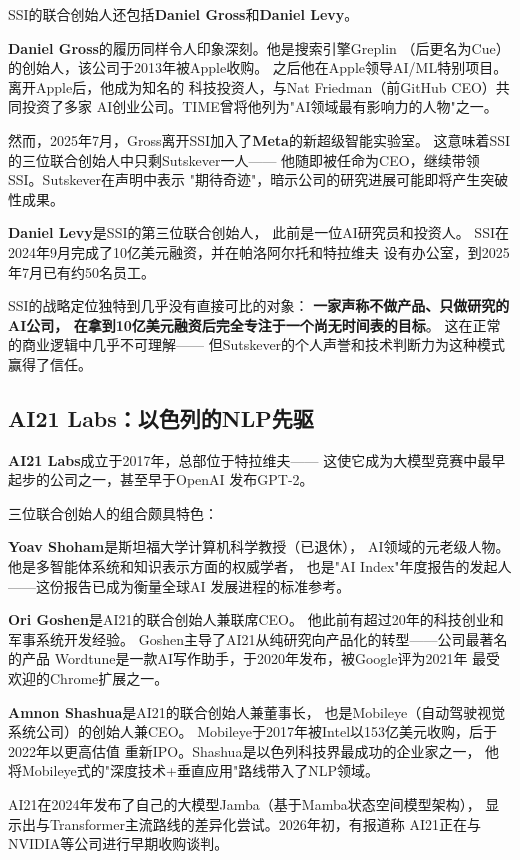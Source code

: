 SSI的联合创始人还包括\textbf{Daniel Gross}和\textbf{Daniel Levy}。

\textbf{Daniel Gross}的履历同样令人印象深刻。他是搜索引擎Greplin
（后更名为Cue）的创始人，该公司于2013年被Apple收购。
之后他在Apple领导AI/ML特别项目。离开Apple后，他成为知名的
科技投资人，与Nat Friedman（前GitHub CEO）共同投资了多家
AI创业公司。TIME曾将他列为"AI领域最有影响力的人物"之一。

然而，2025年7月，Gross离开SSI加入了\textbf{Meta}的新超级智能实验室。
这意味着SSI的三位联合创始人中只剩Sutskever一人——
他随即被任命为CEO，继续带领SSI。Sutskever在声明中表示
"期待奇迹"，暗示公司的研究进展可能即将产生突破性成果。

\textbf{Daniel Levy}是SSI的第三位联合创始人，
此前是一位AI研究员和投资人。
SSI在2024年9月完成了10亿美元融资，并在帕洛阿尔托和特拉维夫
设有办公室，到2025年7月已有约50名员工。

SSI的战略定位独特到几乎没有直接可比的对象：
\textbf{一家声称不做产品、只做研究的AI公司，
在拿到10亿美元融资后完全专注于一个尚无时间表的目标}。
这在正常的商业逻辑中几乎不可理解——
但Sutskever的个人声誉和技术判断力为这种模式赢得了信任。

\subsection{AI21 Labs：以色列的NLP先驱}

\textbf{AI21 Labs}成立于2017年，总部位于特拉维夫——
这使它成为大模型竞赛中最早起步的公司之一，甚至早于OpenAI
发布GPT-2。

三位联合创始人的组合颇具特色：

\textbf{Yoav Shoham}是斯坦福大学计算机科学教授（已退休），
AI领域的元老级人物。他是多智能体系统和知识表示方面的权威学者，
也是"AI Index"年度报告的发起人——这份报告已成为衡量全球AI
发展进程的标准参考。

\textbf{Ori Goshen}是AI21的联合创始人兼联席CEO。
他此前有超过20年的科技创业和军事系统开发经验。
Goshen主导了AI21从纯研究向产品化的转型——公司最著名的产品
Wordtune是一款AI写作助手，于2020年发布，被Google评为2021年
最受欢迎的Chrome扩展之一。

\textbf{Amnon Shashua}是AI21的联合创始人兼董事长，
也是Mobileye（自动驾驶视觉系统公司）的创始人兼CEO。
Mobileye于2017年被Intel以153亿美元收购，后于2022年以更高估值
重新IPO。Shashua是以色列科技界最成功的企业家之一，
他将Mobileye式的"深度技术+垂直应用"路线带入了NLP领域。

AI21在2024年发布了自己的大模型Jamba（基于Mamba状态空间模型架构），
显示出与Transformer主流路线的差异化尝试。2026年初，有报道称
AI21正在与NVIDIA等公司进行早期收购谈判。

